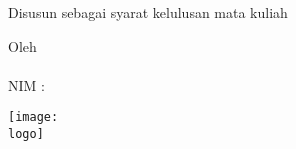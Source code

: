 
\clearpage
\thispagestyle{empty}

\begin{center}

    \Large\bfseries\MakeUppercase{\judulta} 

    \vfill

    \normalsize Disusun sebagai syarat kelulusan mata kuliah\\
    \matakuliah

    \vfill

    \large Oleh \\[0.3em]
    \MakeUppercase{\penulis} \\[0.2em]
    NIM : \nim

    \vfill

    \texttt{[image: \\logo]}

    \vfill

    \large\MakeUppercase{
        \prodi \\[0.2em]
        \fakultas \\[0.2em]
        \itb \\[0.5em]
        \bulan\ \tahun
    }

\end{center}

\clearpage
